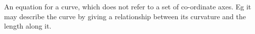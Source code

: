An equation for a curve, which does not refer
to a set of co-ordinate axes. Eg it may describe
the curve by giving a relationship between its 
curvature and the length along it.